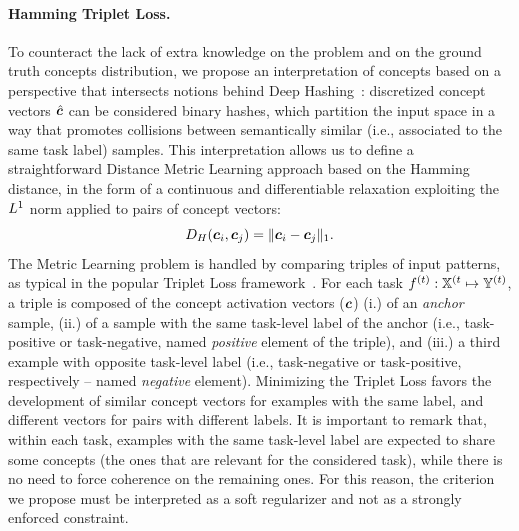 \paragraph{Hamming Triplet Loss.} 
To counteract the lack of extra knowledge on the problem and on the ground truth concepts distribution, we propose an interpretation of concepts based on a perspective that intersects notions behind Deep Hashing~\cite{luo2023survey}: discretized concept vectors $\hat{{\bm{c}}}$ can be considered binary hashes, which partition the input space in a way that promotes collisions between semantically similar (i.e., associated to the same task label) samples.
%
This interpretation allows us to define a straightforward Distance Metric Learning approach based on the Hamming distance, in the form of a continuous and differentiable relaxation %
exploiting the $L^1$ norm applied to pairs of concept vectors: 
\begin{equation*}
	D_{H}({\bm{c}}_i, {\bm{c}}_j) = \| {\bm{c}}_i - {\bm{c}}_j \|_1.
\end{equation*}
The Metric Learning problem is handled by comparing triples of input patterns, as typical in the popular Triplet Loss framework~\cite{dong2018triplet}. For each task $f^{(t)}: {\mathbb{X}}^{(t} \mapsto {\mathbb{Y}}^{(t)}$, a triple is composed of the concept activation vectors (${\bm{c}}$) (i.) of an {\it anchor} sample, (ii.) of a sample with the same task-level label of the anchor (i.e., task-positive or task-negative, named {\it positive} element of the triple), and (iii.) a third example with opposite task-level label (i.e., task-negative or task-positive, respectively -- named {\it negative} element). Minimizing the Triplet Loss favors the development of similar concept vectors for examples with the same label, and different vectors for pairs with different labels. It is important to remark that, within each task, examples with the same task-level label are expected to share some concepts (the ones that are relevant for the considered task), while there is no need to force coherence on the remaining ones. For this reason, the criterion we propose must be interpreted as a soft regularizer and not as a strongly enforced constraint.
